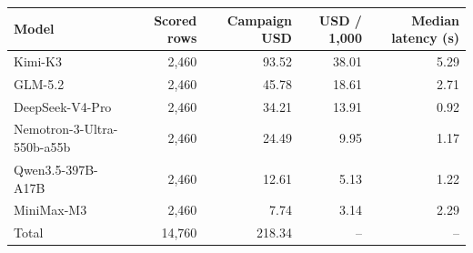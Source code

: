 \begin{tabular}{@{}lrrrr@{}}
\toprule
Model & Scored rows & Campaign USD & USD / 1{,}000 & Median latency (s) \\
\midrule
Kimi-K3 & 2,460 & 93.52 & 38.01 & 5.29 \\
GLM-5.2 & 2,460 & 45.78 & 18.61 & 2.71 \\
DeepSeek-V4-Pro & 2,460 & 34.21 & 13.91 & 0.92 \\
Nemotron-3-Ultra-550b-a55b & 2,460 & 24.49 & 9.95 & 1.17 \\
Qwen3.5-397B-A17B & 2,460 & 12.61 & 5.13 & 1.22 \\
MiniMax-M3 & 2,460 & 7.74 & 3.14 & 2.29 \\
\midrule
Total & 14,760 & 218.34 & -- & -- \\
\bottomrule
\end{tabular}
